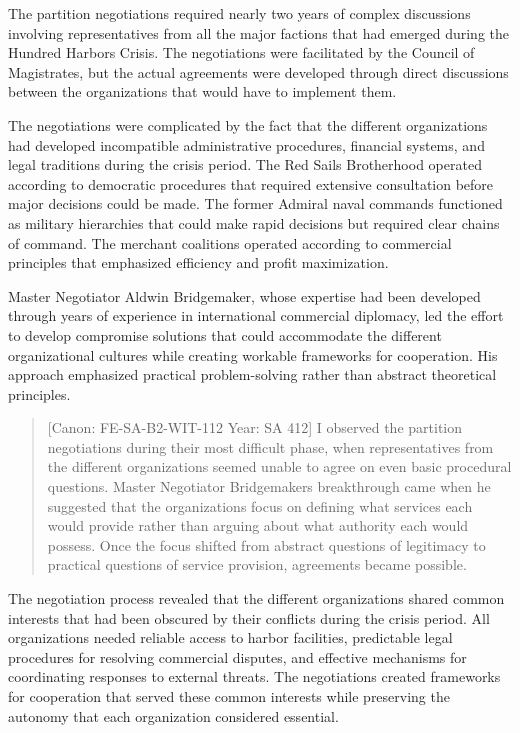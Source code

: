 The partition negotiations required nearly two years of complex
discussions involving representatives from all the major factions that
had emerged during the Hundred Harbors Crisis. The negotiations were
facilitated by the Council of Magistrates, but the actual agreements
were developed through direct discussions between the organizations that
would have to implement them.

The negotiations were complicated by the fact that the different
organizations had developed incompatible administrative procedures,
financial systems, and legal traditions during the crisis period. The
Red Sails Brotherhood operated according to democratic procedures that
required extensive consultation before major decisions could be made.
The former Admiral naval commands functioned as military hierarchies
that could make rapid decisions but required clear chains of command.
The merchant coalitions operated according to commercial principles that
emphasized efficiency and profit maximization.

Master Negotiator Aldwin Bridgemaker, whose expertise had been developed
through years of experience in international commercial diplomacy, led
the effort to develop compromise solutions that could accommodate the
different organizational cultures while creating workable frameworks for
cooperation. His approach emphasized practical problem-solving rather
than abstract theoretical principles.

\begin{quote}
{[}Canon: FE-SA-B2-WIT-112 \textbar{} Year: SA 412{]} I observed the
partition negotiations during their most difficult phase, when
representatives from the different organizations seemed unable to agree
on even basic procedural questions. Master Negotiator
Bridgemaker\textquotesingle s breakthrough came when he suggested that
the organizations focus on defining what services each would provide
rather than arguing about what authority each would possess. Once the
focus shifted from abstract questions of legitimacy to practical
questions of service provision, agreements became possible.
\end{quote}

The negotiation process revealed that the different organizations shared
common interests that had been obscured by their conflicts during the
crisis period. All organizations needed reliable access to harbor
facilities, predictable legal procedures for resolving commercial
disputes, and effective mechanisms for coordinating responses to
external threats. The negotiations created frameworks for cooperation
that served these common interests while preserving the autonomy that
each organization considered essential.


